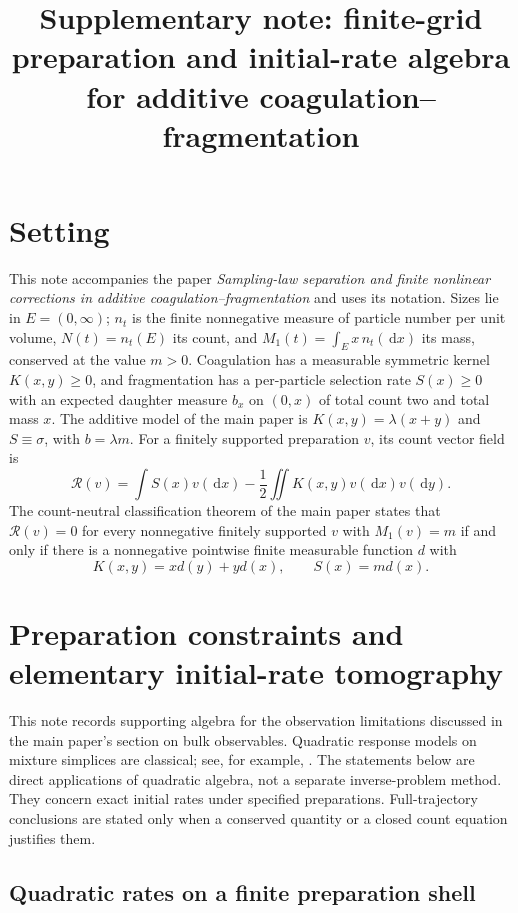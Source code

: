 \documentclass[11pt]{article}
\title{Supplementary note: finite-grid preparation and initial-rate algebra
for additive coagulation--fragmentation}
\author{}
\date{}
\numberwithin{equation}{section}
\theoremstyle{definition}
\theoremstyle{remark}
\newcommand{\dd}{\,\mathrm d}
\newcommand{\1}{\mathbf 1}
\begin{document}
\maketitle

\section*{Setting}

This note accompanies the paper \emph{Sampling-law separation and finite
nonlinear corrections in additive coagulation--fragmentation} and uses its
notation. Sizes lie in $E=(0,\infty)$; $n_t$ is the finite nonnegative
measure of particle number per unit volume, $N(t)=n_t(E)$ its count, and
$M_1(t)=\int_E x\,n_t(\dd x)$ its mass, conserved at the value $m>0$.
Coagulation has a measurable symmetric kernel $K(x,y)\geq0$, and
fragmentation has a per-particle selection rate $S(x)\geq0$ with an
expected daughter measure $b_x$ on $(0,x)$ of total count two and total
mass $x$. The additive model of the main paper is $K(x,y)=\lambda(x+y)$
and $S\equiv\sigma$, with $b=\lambda m$. For a finitely supported
preparation $v$, its count vector field is
\[
 \mathcal R(v)=\int S(x)v(\dd x)-\frac12\iint K(x,y)v(\dd x)v(\dd y).
\]
The count-neutral classification theorem of the main paper states that
$\mathcal R(v)=0$ for every nonnegative finitely supported $v$ with
$M_1(v)=m$ if and only if there is a nonnegative pointwise finite
measurable function $d$ with
\begin{equation}
 K(x,y)=xd(y)+yd(x),\qquad S(x)=md(x).
 \tag{$\ast$}\label{eq:neutral-class-supp}
\end{equation}

\section{Preparation constraints and elementary initial-rate tomography}

This note records supporting algebra for the observation limitations
discussed in the main paper's section on bulk observables. Quadratic response models on mixture simplices
are classical; see, for example, \citet{BrownDonevBissett2015}.
The statements below are direct applications of quadratic algebra,
not a separate inverse-problem method. They concern exact initial rates
under specified preparations. Full-trajectory conclusions are stated
only when a conserved quantity or a closed count equation justifies them.

\subsection{Quadratic rates on a finite preparation shell}
\end{document}
